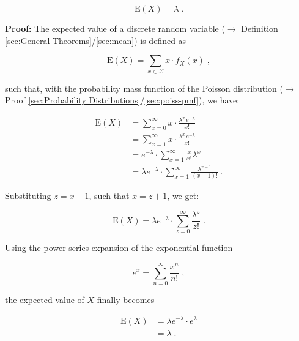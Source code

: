 \documentclass[a4paper,12pt,twoside]{book}
\begin{document}
\begin{equation} \label{eq:poiss-mean-poiss-mean}
\mathrm{E}(X) = \lambda \; .
\end{equation}


\vspace{1em}
\textbf{Proof:} The expected value of a discrete random variable ($\rightarrow$ Definition \ref{sec:General Theorems}/\ref{sec:mean}) is defined as

\begin{equation} \label{eq:poiss-mean-mean}
\mathrm{E}(X) = \sum_{x \in \mathcal{X}} x \cdot f_X(x) \; ,
\end{equation}

such that, with the probability mass function of the Poisson distribution ($\rightarrow$ Proof \ref{sec:Probability Distributions}/\ref{sec:poiss-pmf}), we have:

\begin{equation} \label{eq:poiss-mean-poiss-mean-s1}
\begin{split}
\mathrm{E}(X) &= \sum_{x=0}^\infty x \cdot \frac{\lambda^x \, e^{-\lambda}}{x!} \\
&= \sum_{x=1}^\infty x \cdot \frac{\lambda^x \, e^{-\lambda}}{x!} \\
&= e^{-\lambda} \cdot \sum_{x=1}^\infty \frac{x}{x!} \lambda^x \\
&= \lambda e^{-\lambda} \cdot \sum_{x=1}^\infty \frac{\lambda^{x-1}}{(x-1)!} \; .
\end{split}
\end{equation}

Substituting $z = x-1$, such that $x = z+1$, we get:

\begin{equation} \label{eq:poiss-mean-poiss-mean-s2}
\mathrm{E}(X) = \lambda e^{-\lambda} \cdot \sum_{z=0}^\infty \frac{\lambda^z}{z!} \; .
\end{equation}

Using the power series expansion of the exponential function

\begin{equation} \label{eq:poiss-mean-exp-ps}
e^x = \sum_{n=0}^\infty \frac{x^n}{n!} \; ,
\end{equation}

the expected value of $X$ finally becomes

\begin{equation} \label{eq:poiss-mean-poiss-mean-s3}
\begin{split}
\mathrm{E}(X) &= \lambda e^{-\lambda} \cdot e^{\lambda} \\
&= \lambda \; .
\end{split}
\end{equation}
\end{document}
